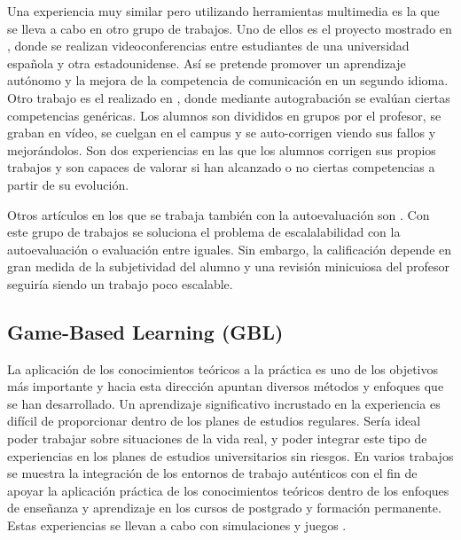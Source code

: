 Una experiencia muy similar pero utilizando herramientas multimedia es la que se lleva a cabo en otro grupo de trabajos. Uno de ellos es el proyecto mostrado en \cite{Martin-Cuadrado:2013}, donde se realizan videoconferencias entre estudiantes de una universidad española y otra estadounidense. Así se pretende promover un aprendizaje autónomo y la mejora de la competencia de comunicación en un segundo idioma. Otro trabajo es el realizado en \cite{Masip-Alvarez:2013}, donde mediante autograbación se evalúan ciertas competencias genéricas. Los alumnos son divididos en grupos por el profesor, se graban en vídeo, se cuelgan en el campus y se auto-corrigen viendo sus fallos y mejorándolos. Son dos experiencias en las que los alumnos corrigen sus propios trabajos y son capaces de valorar si han alcanzado o no ciertas competencias a partir de su evolución.

Otros artículos en los que se trabaja también con la autoevaluación son \cite{Colomo-Palacios:2013,Liao:2013,McMahon:2007,Murdoch-Eaton:2012,Chebil:2012,Cardona:2013}. Con este grupo de trabajos se soluciona el problema de escalalabilidad con la autoevaluación o evaluación entre iguales. Sin embargo, la calificación depende en gran medida de la subjetividad del alumno y una revisión minicuiosa del profesor seguiría siendo un trabajo poco escalable. 

\subsection{Game-Based Learning (GBL)} 
La aplicación de los conocimientos teóricos a la práctica es uno de los objetivos más importante y hacia esta dirección apuntan diversos métodos y enfoques que se han desarrollado. Un aprendizaje significativo incrustado en la experiencia es difícil de proporcionar dentro de los planes de estudios regulares. Sería ideal poder trabajar sobre situaciones de la vida real, y poder integrar este tipo de experiencias en los planes de estudios universitarios sin riesgos. En varios trabajos se muestra la integración de los entornos de trabajo auténticos con el fin de apoyar la aplicación práctica de los conocimientos teóricos dentro de los enfoques de enseñanza y aprendizaje en los cursos de postgrado y formación permanente. Estas experiencias se llevan a cabo con simulaciones y juegos \cite{Petersen:2012,Borrajo:2010}.

